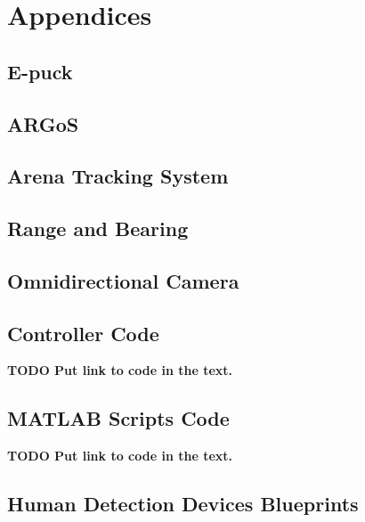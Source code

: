 \documentclass[oneside, a4paper, 12pt]{memoir}
\begin{document}
\part*{Appendices}
\appendix


\chapter{E-puck}

\chapter{ARGoS}

\chapter{Arena Tracking System}
\label{app:arena_tracking_system}

\chapter{Range and Bearing}

\chapter{Omnidirectional Camera}

\chapter{Controller Code}

\textbf{TODO Put link to code in the text.}

\chapter{MATLAB Scripts Code}

\textbf{TODO Put link to code in the text.}

\chapter{Human Detection Devices Blueprints}

\backmatter
\newpage
\end{document}
